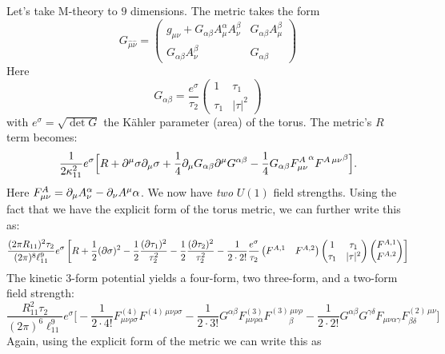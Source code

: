 \documentclass[11pt, class=article, crop=false]{standalone}
\begin{document}
\begin{enumerate}
	Let's take M-theory to $9$ dimensions. The metric takes the form
	\[
		G_{\hat \mu \hat \nu} = \begin{pmatrix}
			g_{\mu \nu} + G_{\alpha \beta} A_\mu^\alpha A_\nu^\beta & G_{\alpha \beta} A^\beta_\mu \\
			G_{\alpha \beta} A_\nu^\beta  & G_{\alpha \beta}
		\end{pmatrix}
	\]
	Here
	\[
		G_{\alpha \beta} = \frac{e^{\sigma}}{\tau_2} \begin{pmatrix}
			1 & \tau_1\\
			\tau_1 & |\tau|^2
		\end{pmatrix}
	\]
	with $e^{\sigma} = \sqrt{\det G}$ the K\"ahler parameter (area) of the torus. 
	The metric's $R$ term becomes:
	\[
		\frac{1}{2 \kappa_{11}^2} e^{\sigma} \Big[R + \partial^\mu \sigma \partial_\mu \sigma + \frac14 \partial_\mu G_{\alpha \beta} \partial^\mu G^{\alpha \beta} - \frac14 G_{\alpha \beta} {F_{\mu \nu}^A}^\alpha {F^{A\, \mu \nu}}^\beta \Big].
	\]
	Here $F_{\mu \nu}^A = \partial_\mu A_\nu^\alpha - \partial_\nu A^\mu \alpha$. We now have \emph{two} $U(1)$ field strengths. Using the fact that we have the explicit form of the torus metric, we can further write this as:
	\begin{equation}\label{eq:MframeLag}
		\frac{(2\pi R_{11})^2 \tau_2}{(2\pi)^8 \ell_{11}^9} e^\sigma \left[R + \frac12 (\partial\sigma)^2 - \frac12 \frac{(\partial \tau_1)^2}{\tau_2^2} - \frac12 \frac{(\partial\tau_2)^2}{\tau_2^2} - \frac{1}{2\cdot 2!} \frac{e^{\sigma}}{\tau_2} \begin{pmatrix}
			F^{A,1} & F^{A,2}
		\end{pmatrix}\begin{pmatrix}
			1 & \tau_1\\ \tau_1 & |\tau|^2
		\end{pmatrix}\begin{pmatrix}
			F^{A,1}\\ F^{A,2}
		\end{pmatrix} \right]
	\end{equation}
	The kinetic 3-form potential yields a four-form, two three-form, and a two-form field strength:
	\[
		\frac{R_{11}^2 \tau_2}{(2 \pi)^6 \ell_{11}^9} e^{\sigma} \Big[-\frac{1}{2 \cdot 4!} F_{\mu \nu \rho \sigma}^{(4)} F^{(4)\, \mu \nu \rho \sigma} - \frac{1}{2 \cdot 3!} G^{\alpha \beta} F_{\mu \nu \rho \alpha}^{(3)} F_{\qquad\; \beta}^{(3)\, \mu \nu \rho} - \frac{1}{2 \cdot 2!} G^{\alpha \beta} G^{\gamma \delta} F_{\mu \nu \alpha \gamma} F_{\beta \delta}^{(2)\, \mu \nu}]
	\]
	Again, using the explicit form of the metric we can write this as
	\[
	\begin{aligned}

\end{aligned}\]
\end{enumerate}
\end{document}
